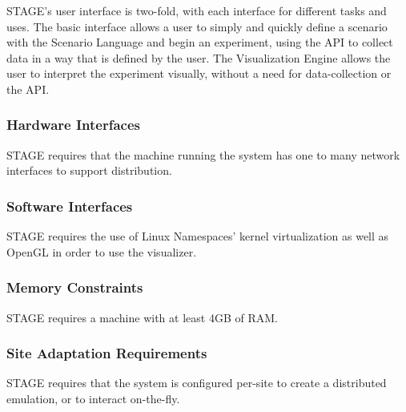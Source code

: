 \documentclass[titlepage]{article}
\begin{document}
STAGE's user interface is two-fold, with each interface for different tasks and uses. The basic interface allows a user to simply and quickly define a scenario with the Scenario Language and begin an experiment, using the API to collect data in a way that is defined by the user. The Visualization Engine allows the user to interpret the experiment visually, without a need for data-collection or the API.


\subsubsection{Hardware Interfaces%
  \label{hardware-interfaces}%
}

STAGE requires that the machine running the system has one to many network interfaces to support distribution.


\subsubsection{Software Interfaces%
  \label{software-interfaces}%
}

STAGE requires the use of Linux Namespaces' kernel virtualization as well as OpenGL in order to use the visualizer.


\subsubsection{Memory Constraints%
  \label{memory-constraints}%
}

STAGE requires a machine with at least 4GB of RAM.


\subsubsection{Site Adaptation Requirements%
  \label{site-adaptation-requirements}%
}

STAGE requires that the system is configured per-site to create a distributed emulation, or to interact on-the-fly.

\end{document}
